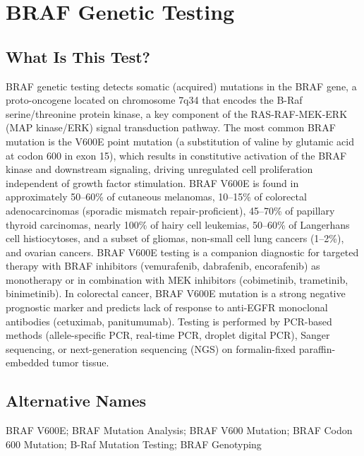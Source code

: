 \chapter{BRAF Genetic Testing}

\section*{What Is This Test?}
BRAF genetic testing detects somatic (acquired) mutations in the BRAF gene, a proto-oncogene located on chromosome 7q34 that encodes the B-Raf serine/threonine protein kinase, a key component of the RAS-RAF-MEK-ERK (MAP kinase/ERK) signal transduction pathway. The most common BRAF mutation is the V600E point mutation (a substitution of valine by glutamic acid at codon 600 in exon 15), which results in constitutive activation of the BRAF kinase and downstream signaling, driving unregulated cell proliferation independent of growth factor stimulation. BRAF V600E is found in approximately 50--60\% of cutaneous melanomas, 10--15\% of colorectal adenocarcinomas (sporadic mismatch repair-proficient), 45--70\% of papillary thyroid carcinomas, nearly 100\% of hairy cell leukemias, 50--60\% of Langerhans cell histiocytoses, and a subset of gliomas, non-small cell lung cancers (1--2\%), and ovarian cancers. BRAF V600E testing is a companion diagnostic for targeted therapy with BRAF inhibitors (vemurafenib, dabrafenib, encorafenib) as monotherapy or in combination with MEK inhibitors (cobimetinib, trametinib, binimetinib). In colorectal cancer, BRAF V600E mutation is a strong negative prognostic marker and predicts lack of response to anti-EGFR monoclonal antibodies (cetuximab, panitumumab). Testing is performed by PCR-based methods (allele-specific PCR, real-time PCR, droplet digital PCR), Sanger sequencing, or next-generation sequencing (NGS) on formalin-fixed paraffin-embedded tumor tissue.

\section*{Alternative Names}
BRAF V600E; BRAF Mutation Analysis; BRAF V600 Mutation; BRAF Codon 600 Mutation; B-Raf Mutation Testing; BRAF Genotyping

